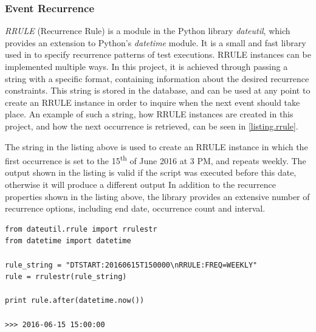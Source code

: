 \subsubsection{Event Recurrence}
\emph{RRULE} (Recurrence Rule) is a module in the Python library \emph{dateutil}, which provides an extension to Python's \emph{datetime} module. It  is a small and fast library used in \toolname \space to specify recurrence patterns of test executions. RRULE instances can be implemented multiple ways. In this project, it is achieved through passing a string with a specific format, containing information about the desired recurrence constraints. This string is stored in the database, and can be used at any point to create an RRULE instance in order to inquire when the next event should take place. An example of such a string, how RRULE instances are created in this project, and how the next occurrence is retrieved, can be seen in \lstlistingname \space \ref{listing.rrule}.

The string in the listing above is used to create an RRULE instance in which the first occurrence is set to the 15\textsuperscript{th} of June 2016 at 3 PM, and repeats weekly. The output shown in the listing is valid if the script was executed before this date, otherwise it will produce a different output  In addition to the recurrence properties shown in the listing above, the library provides an extensive number of recurrence options, including end date, occurrence count and interval.

\vspace{4mm}
\noindent\begin{minipage}{\textwidth}
\begin{lstlisting}[caption=Recursion Rule, label={listing.rrule}]
from dateutil.rrule import rrulestr
from datetime import datetime

rule_string = "DTSTART:20160615T150000\nRRULE:FREQ=WEEKLY"
rule = rrulestr(rule_string)

print rule.after(datetime.now())

>>> 2016-06-15 15:00:00
\end{lstlisting}
\end{minipage}


